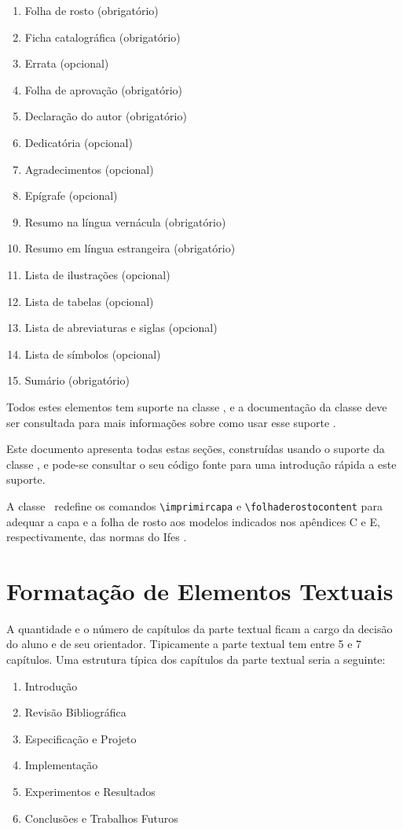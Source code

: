 \documentclass[times,english,brazil,oneside,section=TITLE]{ifes8}
\begin{document}
\begin{enumerate}
\item Folha de rosto (obrigatório)
\item Ficha catalográfica (obrigatório)
\item Errata (opcional)
\item Folha de aprovação (obrigatório)
\item Declaração do autor (obrigatório)
\item Dedicatória (opcional)
\item Agradecimentos (opcional)
\item Epígrafe (opcional)
\item Resumo na língua vernácula (obrigatório)
\item Resumo em língua estrangeira (obrigatório)
\item Lista de ilustrações (opcional)
\item Lista de tabelas (opcional)
\item Lista de abreviaturas e siglas (opcional)
\item Lista de símbolos (opcional)
\item Sumário (obrigatório)
\end{enumerate}

Todos estes elementos tem suporte na classe \abnTeX, e a documentação
da classe deve ser consultada para mais informações sobre como usar
esse suporte \cite{Araujo2016}.

Este documento apresenta todas estas seções, construídas usando o
suporte da classe \abnTeX, e pode-se consultar o seu código fonte para
uma introdução rápida a este suporte.

A classe \ifestex\ redefine os comandos \verb!\imprimircapa! e
\verb!\folhaderostocontent! para adequar a capa e a folha de rosto aos
modelos indicados nos apêndices C e E, respectivamente, das normas do
Ifes \cite{Ifes2017}.



\chapter{Formatação de Elementos Textuais}
\label{cha:format-text}

A quantidade e o número de capítulos da parte textual ficam a cargo da
decisão do aluno e de seu orientador. Tipicamente a parte textual tem
entre 5 e 7 capítulos. Uma estrutura típica dos capítulos da parte
textual seria a seguinte:

\begin{SingleSpace}
  \begin{enumerate}
  \item Introdução
  \item Revisão Bibliográfica
  \item Especificação e Projeto
  \item Implementação
  \item Experimentos e Resultados
  \item Conclusões e Trabalhos Futuros
  \end{enumerate}
\end{SingleSpace}
\end{document}
